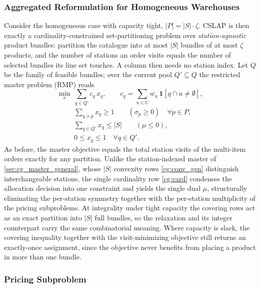 \documentclass[preprint,review,11pt,authoryear]{elsarticle}
\begin{document}
\subsubsection{Aggregated Reformulation for Homogeneous Warehouses}\label{sec:cg_master_agg}

Consider the homogeneous case with capacity tight, $|P| = |S|\cdot\zeta$. CSLAP is then exactly a cardinality-constrained set-partitioning problem over \emph{station-agnostic} product bundles: partition the catalogue into at most $|S|$ bundles of at most $\zeta$ products, and the number of stations an order visits equals the number of selected bundles its line set touches. A column then needs no station index. Let $Q$ be the family of feasible bundles; over the current pool $Q' \subseteq Q$ the restricted master problem (RMP) reads
\[
\min_{x}\ \sum_{q \in Q'} c_q\, x_q, \qquad c_q = \sum_{u \in U} w_u\,\mathbf{1}[q \cap u \neq \emptyset],
\]
\begin{align}
& \sum_{q \ni p} x_q \ge 1 \qquad (\sigma_p \ge 0) \quad \forall p \in P, \label{cg:cover}\\
& \sum_{q \in Q'} x_q \le |S| \qquad (\mu \le 0), \label{cg:card}\\
& 0 \le x_q \le 1 \quad \forall q \in Q'. \nonumber
\end{align}
As before, the master objective equals the total station visits of the multi-item orders exactly for any partition. Unlike the station-indexed master of \cref{sec:cg_master_general}, whose $|S|$ convexity rows \eqref{cg:conv_gen} distinguish interchangeable stations, the single cardinality row \eqref{cg:card} condenses the allocation decision into one constraint and yields the single dual $\mu$, structurally eliminating the per-station symmetry together with the per-station multiplicity of the pricing subproblems. At integrality under tight capacity the covering rows act as an exact partition into $|S|$ full bundles, so the relaxation and its integer counterpart carry the same combinatorial meaning. Where capacity is slack, the covering inequality together with the visit-minimizing objective still returns an exactly-once assignment, since the objective never benefits from placing a product in more than one bundle.


\subsubsection{Pricing Subproblem}
\end{document}
